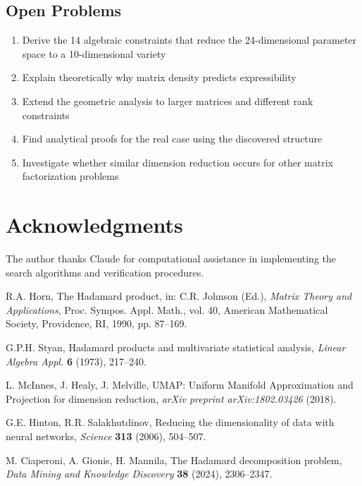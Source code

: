 \documentclass[11pt]{amsart}
\theoremstyle{plain}
\theoremstyle{definition}
\theoremstyle{remark}
\begin{document}
\subsection{Open Problems}

\begin{enumerate}
\item Derive the 14 algebraic constraints that reduce the 24-dimensional parameter space to a 10-dimensional variety
\item Explain theoretically why matrix density predicts expressibility
\item Extend the geometric analysis to larger matrices and different rank constraints
\item Find analytical proofs for the real case using the discovered structure
\item Investigate whether similar dimension reduction occurs for other matrix factorization problems
\end{enumerate}

\section*{Acknowledgments}

The author thanks Claude for computational assistance in implementing the search algorithms and verification procedures.

\begin{thebibliography}{99}

R.A. Horn, The Hadamard product, in: C.R. Johnson (Ed.), \emph{Matrix Theory and Applications}, Proc. Sympos. Appl. Math., vol. 40, American Mathematical Society, Providence, RI, 1990, pp. 87--169.

G.P.H. Styan, Hadamard products and multivariate statistical analysis, \emph{Linear Algebra Appl.} \textbf{6} (1973), 217--240.

L. McInnes, J. Healy, J. Melville, UMAP: Uniform Manifold Approximation and Projection for dimension reduction, \emph{arXiv preprint arXiv:1802.03426} (2018).

G.E. Hinton, R.R. Salakhutdinov, Reducing the dimensionality of data with neural networks, \emph{Science} \textbf{313} (2006), 504--507.

M. Ciaperoni, A. Gionis, H. Mannila, The Hadamard decomposition problem, \emph{Data Mining and Knowledge Discovery} \textbf{38} (2024), 2306--2347.

\end{thebibliography}
\end{document}
